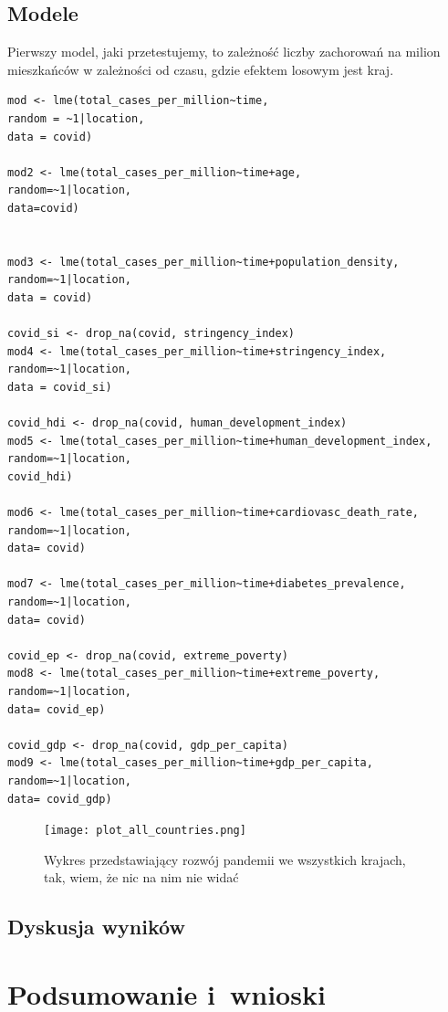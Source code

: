 \documentclass[12pt]{mwbk}
\theoremstyle{plain}
\theoremstyle{definition}
\theoremstyle{remark}
\newcommand\zrodlo[1]{\par\vspace{-3mm}{\small\textit{Źródło: }#1 }}
\begin{document}
\section{Modele}

Pierwszy model, jaki przetestujemy, to zależność liczby zachorowań na milion mieszkańców w zależności od czasu, gdzie efektem losowym jest kraj.

\begin{verbatim}
mod <- lme(total_cases_per_million~time, 
random = ~1|location, 
data = covid)

mod2 <- lme(total_cases_per_million~time+age,
random=~1|location,
data=covid)


mod3 <- lme(total_cases_per_million~time+population_density,
random=~1|location,
data = covid)

covid_si <- drop_na(covid, stringency_index)
mod4 <- lme(total_cases_per_million~time+stringency_index,
random=~1|location,
data = covid_si)

covid_hdi <- drop_na(covid, human_development_index)
mod5 <- lme(total_cases_per_million~time+human_development_index,
random=~1|location,
covid_hdi)

mod6 <- lme(total_cases_per_million~time+cardiovasc_death_rate,
random=~1|location,
data= covid)

mod7 <- lme(total_cases_per_million~time+diabetes_prevalence,
random=~1|location,
data= covid)

covid_ep <- drop_na(covid, extreme_poverty)
mod8 <- lme(total_cases_per_million~time+extreme_poverty,
random=~1|location,
data= covid_ep)

covid_gdp <- drop_na(covid, gdp_per_capita)
mod9 <- lme(total_cases_per_million~time+gdp_per_capita,
random=~1|location,
data= covid_gdp)
\end{verbatim}

\begin{figure}[htbp]
	\centering
	\texttt{[image: plot\_all\_countries.png]}
	\caption{Wykres przedstawiający rozwój pandemii we wszystkich krajach, tak, wiem, że nic na nim nie widać}
	\label{fig:plot_all}
	\zrodlo{Opracowanie własne}
\end{figure}


\section{Dyskusja wyników}



\chapter*{Podsumowanie i~wnioski}
\end{document}
